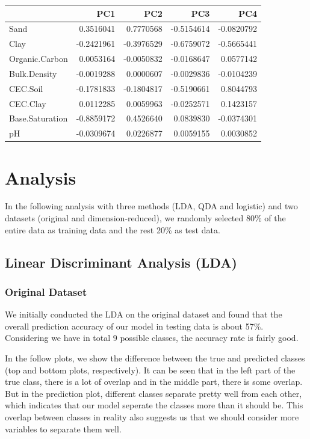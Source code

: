 \documentclass[]{article}
\begin{document}
\begin{longtable}[]{@{}lrrrr@{}}
\toprule
& PC1 & PC2 & PC3 & PC4\tabularnewline
\midrule
\endhead
Sand & 0.3516041 & 0.7770568 & -0.5154614 & -0.0820792\tabularnewline
Clay & -0.2421961 & -0.3976529 & -0.6759072 & -0.5665441\tabularnewline
Organic.Carbon & 0.0053164 & -0.0050832 & -0.0168647 &
0.0577142\tabularnewline
Bulk.Density & -0.0019288 & 0.0000607 & -0.0029836 &
-0.0104239\tabularnewline
CEC.Soil & -0.1781833 & -0.1804817 & -0.5190661 &
0.8044793\tabularnewline
CEC.Clay & 0.0112285 & 0.0059963 & -0.0252571 & 0.1423157\tabularnewline
Base.Saturation & -0.8859172 & 0.4526640 & 0.0839830 &
-0.0374301\tabularnewline
pH & -0.0309674 & 0.0226877 & 0.0059155 & 0.0030852\tabularnewline
\bottomrule
\end{longtable}

\section{Analysis}\label{analysis}

In the following analysis with three methods (LDA, QDA and logistic) and
two datasets (original and dimension-reduced), we randomly selected 80\%
of the entire data as training data and the rest 20\% as test data.

\subsection{Linear Discriminant Analysis
(LDA)}\label{linear-discriminant-analysis-lda}

\subsubsection{Original Dataset}\label{original-dataset}

We initially conducted the LDA on the original dataset and found that
the overall prediction accuracy of our model in testing data is about
57\%. Considering we have in total 9 possible classes, the accuracy rate
is fairly good.

In the follow plots, we show the difference between the true and
predicted classes (top and bottom plots, respectively). It can be seen
that in the left part of the true class, there is a lot of overlap and
in the middle part, there is some overlap. But in the prediction plot,
different classes separate pretty well from each other, which indicates
that our model seperate the classes more than it should be. This overlap
between classes in reality also suggests us that we should consider more
variables to separate them well.
\end{document}
